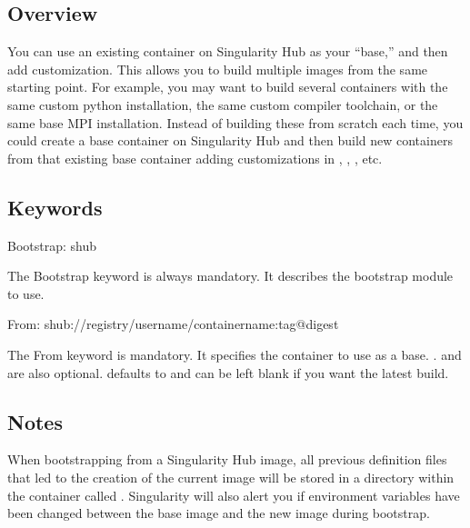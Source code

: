 \documentclass[letterpaper,10pt,english]{sphinxmanual}
\begin{document}
\subsection{Overview}
\label{\detokenize{appendix:sec-build-shub}}\label{\detokenize{appendix:id3}}
You can use an existing container on Singularity Hub as your “base,” and then add customization. This allows you to build multiple images
from the same starting point. For example, you may want to build several containers with the same custom python installation, the same custom
compiler toolchain, or the same base MPI installation. Instead of building these from scratch each time, you could create a base container on
Singularity Hub and then build new containers from that existing base container adding customizations in  , , , etc.


\subsection{Keywords}
\label{\detokenize{appendix:id4}}
%
\begin{sphinxVerbatim}[commandchars=\\\{\}]
Bootstrap: shub
\end{sphinxVerbatim}

The Bootstrap keyword is always mandatory. It describes the bootstrap module to use.

%
\begin{sphinxVerbatim}[commandchars=\\\{\}]
From: shub://\PYGZlt{}registry\PYGZgt{}/\PYGZlt{}username\PYGZgt{}/\PYGZlt{}container\PYGZhy{}name\PYGZgt{}:\PYGZlt{}tag\PYGZgt{}@digest
\end{sphinxVerbatim}

The From keyword is mandatory. It specifies the container to use as a base. .
 and  are also optional.  defaults to  and  can be left blank if you want the latest build.


\subsection{Notes}
\label{\detokenize{appendix:id5}}
When bootstrapping from a Singularity Hub image, all previous definition files that led to the creation of the current image will be stored
in a directory within the container called . Singularity will also alert you if environment variables have
been changed between the base image and the new image during bootstrap.
\end{document}
